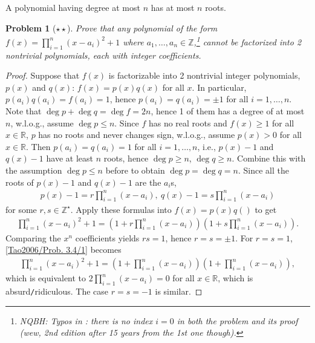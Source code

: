 \documentclass{article}
\numberwithin{equation}{section}
\newtheorem{problem}{Problem}[section]
\begin{document}
A polynomial having degree at most $n$ has at most $n$ roots.
\begin{problem}[$\star\star$]
	Prove that any polynomial of the form $f(x) = \prod_{i=1}^n (x - a_i)^2 + 1$ where $a_1,\ldots,a_n\in\mathbb{Z}$,\footnote{NQBH: Typos in \cite[Problem. 3.4, p. 45.]{Tao2006}: there is no index $i = 0$ in both the problem and its proof (wew,  2nd edition after 15 years from the 1st one though).} cannot be factorized into 2 nontrivial polynomials, each with integer coefficients.
\end{problem}

\begin{proof}[Proof]
	Suppose that $f(x)$ is factorizable into 2 nontrivial integer polynomials, $p(x)$ and $q(x)$: $f(x) = p(x)q(x)$ for all $x$. In particular, $p(a_i)q(a_i) = f(a_i) = 1$, hence $p(a_i) = q(a_i) = \pm1$ for all $i = 1,\ldots,n$. Note that $\deg p + \deg q = \deg f = 2n$, hence 1 of them has a degree of at most $n$, w.l.o.g., assume $\deg p\le n$. Since $f$ has no real roots and $f(x)\ge 1$ for all $x\in\mathbb{R}$, $p$ has no roots and never changes sign, w.l.o.g., assume $p(x) > 0$ for all $x\in\mathbb{R}$. Then $p(a_i) = q(a_i) = 1$ for all $i = 1,\ldots,n$, i.e., $p(x) - 1$ and $q(x) - 1$ have at least $n$ roots, hence $\deg p\ge n$, $\deg q\ge n$. Combine this with the assumption $\deg p\le n$ before to obtain $\deg p = \deg q = n$. Since all the roots of $p(x) - 1$ and $q(x) - 1$ are the $a_i$s,
	\begin{align*}
		p(x) - 1 = r\prod_{i=1}^n (x - a_i),\ q(x) - 1 = s\prod_{i=1}^n (x - a_i)
	\end{align*}
	for some $r,s\in\mathbb{Z}^\star$. Apply these formulas into $f(x) = p(x)q()$ to get
	\begin{align}
		\label{Tao2006/Prob. 3.4/1}
		\prod_{i=1}^n (x - a_i)^2 + 1 = \left(1 + r\prod_{i=1}^n (x - a_i)\right)\left(1 + s\prod_{i=1}^n (x - a_i)\right).
	\end{align}
	Comparing the $x^n$ coefficients yields $rs = 1$, hence $r = s = \pm 1$. For $r = s = 1$, \eqref{Tao2006/Prob. 3.4/1} becomes
	\begin{align}
		\label{Tao2006/Prob. 3.4/2}
		\prod_{i=1}^n (x - a_i)^2 + 1 = \left(1 + \prod_{i=1}^n (x - a_i)\right)\left(1 + \prod_{i=1}^n (x - a_i)\right),
	\end{align}
	which is equivalent to $2\prod_{i=1}^n (x - a_i) = 0$ for all $x\in\mathbb{R}$, which is absurd\texttt{/}ridiculous. The case $r = s = -1$ is similar. 
\end{proof}
\end{document}
